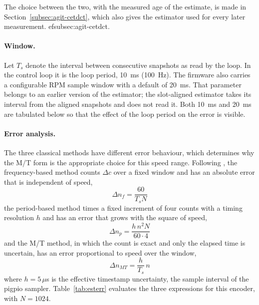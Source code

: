 The choice between the two, with the measured age of the estimate, is made in Section~\ref{subsec:agit-cetdct}, which also gives the estimator used for every later measurement.
ef{subsec:agit-cetdct}.

\paragraph{Window.}
Let $T_s$ denote the interval between consecutive snapshots as read by the loop. In the control loop it is the loop period, 10~ms (100~Hz). The firmware also carries a configurable RPM sample window with a default of 20~ms. That parameter belongs to an earlier version of the estimator; the slot-aligned estimator takes its interval from the aligned snapshots and does not read it. Both 10~ms and 20~ms are tabulated below so that the effect of the loop period on the error is visible.


\paragraph{Error analysis.}
The three classical methods have different error behaviour, which determines why the M/T form is the appropriate choice for this speed range. Following \citet{anuchin2019}, the frequency-based method counts $\Delta c$ over a fixed window and has an absolute error that is independent of speed,
\begin{equation}
    \Delta n_f = \frac{60}{T_s N}
    \label{eq:fm}
\end{equation}
the period-based method times a fixed increment of four counts with a timing resolution $h$ and has an error that grows with the square of speed,
\begin{equation}
    \Delta n_p = \frac{h \, n^{2} N}{60 \cdot 4}
    \label{eq:tm}
\end{equation}
and the M/T method, in which the count is exact and only the elapsed time is uncertain, has an error proportional to speed over the window,
\begin{equation}
    \Delta n_{MT} = \frac{h}{T_s}\, n
    \label{eq:mt}
\end{equation}
where $h = 5\,\mu$s is the effective timestamp uncertainty, the sample interval of the pigpio sampler. Table~\ref{tab:esterr} evaluates the three expressions for this encoder, with $N = 1024$.

